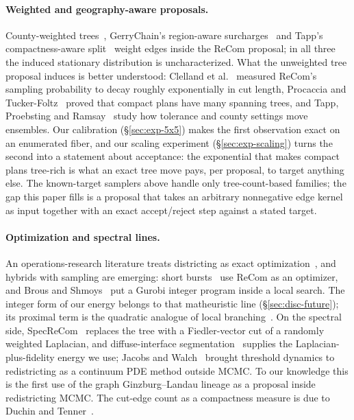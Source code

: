 \documentclass[11pt]{article}
\begin{document}
\paragraph{Weighted and geography-aware proposals.} County-weighted
trees~\cite{clelland2022colorado}, GerryChain's region-aware
surcharges~\cite{gerrychain2024} and Tapp's compactness-aware
split~\cite{tapp2025compactness} weight edges inside the ReCom
proposal; in all three the induced stationary distribution is
uncharacterized. What the unweighted tree proposal induces is better
understood: Clelland et al.~\cite{clelland2021compactness} measured
ReCom's sampling probability to decay roughly exponentially in cut
length, Procaccia and Tucker-Foltz~\cite{procaccia2022compact} proved
that compact plans have many spanning trees, and Tapp, Proebsting and
Ramsay~\cite{tapp2025parameter} study how tolerance and county
settings move ensembles. Our calibration (\S\ref{sec:exp-5x5}) makes
the first observation exact on an enumerated fiber, and our scaling
experiment (\S\ref{sec:exp-scaling}) turns the second into a statement
about acceptance: the exponential that makes compact plans tree-rich
is what an exact tree move pays, per proposal, to target anything
else. The known-target samplers above handle only tree-count-based
families; the gap this paper fills is a proposal that takes an
arbitrary nonnegative edge kernel as input together with an exact
accept/reject step against a stated target.

\paragraph{Optimization and spectral lines.} An operations-research
literature treats districting as exact
optimization~\cite{gurnee2021fairmandering,swamy2023multiobjective,
validi2022imposing,validi2022political,dobbs2024facilitating}, and
hybrids with sampling are emerging: short bursts~\cite{cannon2023voting}
use ReCom as an optimizer, and Brous and Shmoys~\cite{brous2025recom}
put a Gurobi integer program inside a local search. The integer form
of our energy belongs to that matheuristic line (\S\ref{sec:disc-future});
its proximal term is the quadratic analogue of local
branching~\cite{fischetti2003local}. On the spectral side,
SpecReCom~\cite{davies2025spectral} replaces the tree with a
Fiedler-vector cut of a randomly weighted Laplacian, and
diffuse-interface segmentation~\cite{chan2001active,bertozzi2012diffuse,
merkurjev2013mbo,pilavci2021graph} supplies the Laplacian-plus-fidelity
energy we use; Jacobs and Walch~\cite{jacobs2018pde,jacobs2018auction}
brought threshold dynamics to redistricting as a continuum PDE method
outside MCMC. To our knowledge this is the first use of the graph
Ginzburg--Landau lineage as a proposal inside redistricting MCMC. The
cut-edge count as a compactness measure is due to Duchin and
Tenner~\cite{duchin2018discrete}.
\end{document}
